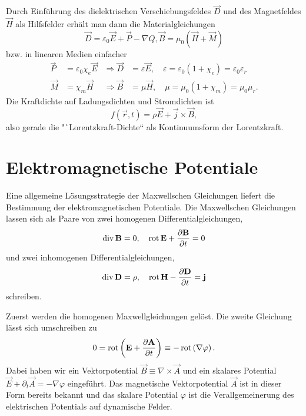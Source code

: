 Durch Einführung des dielektrischen Verschiebungsfeldes $\vec {D}$ und des Magnetfeldes $\vec {H}$ als Hilfsfelder erhält man dann die Materialgleichungen
\begin{equation*}
	\vec {D}=\varepsilon _{0}\vec {E}+\vec {P}-\nabla Q, \vec {B}=\mu _{0}\left(\vec {H}+\vec {M}\right)
\end{equation*}
bzw. in linearen Medien einfacher
\begin{align*}
	\vec {P} & =\varepsilon _{0}\chi _{e}\vec {E} & \Rightarrow \vec {D} & =\varepsilon \vec {E},\quad \varepsilon =\varepsilon _{0}\left(1+\chi _{e}\right)=\varepsilon _{0}\varepsilon _{r} \\
	\vec {M} & =\chi _{m}\vec {H}                 & \Rightarrow \vec {B} & =\mu \vec {H},\quad \mu =\mu _{0}\left(1+\chi _{m}\right)=\mu _{0}\mu _{r}.
\end{align*}
Die Kraftdichte auf Ladungsdichten und Stromdichten ist
\begin{equation*}
	f\left(\vec {r},t\right)=\rho \vec {E}+\vec {j}\times \vec {B},
\end{equation*}
also gerade die "`Lorentzkraft-Dichte`` als Kontinuumsform der Lorentzkraft.

\section{Elektromagnetische Potentiale}

Eine allgemeine Lösungsstrategie der Maxwellschen Gleichungen liefert die Bestimmung der elektromagnetischen Potentiale. Die Maxwellschen Gleichungen lassen sich als Paare von zwei homogenen Differentialgleichungen,
\begin{equation*}
	\operatorname{div} \mathbf{B}=0, \quad\operatorname{rot} \mathbf{E}+\frac{\partial \mathbf{B}}{\partial t}=0
\end{equation*}
und zwei inhomogenen Differentialgleichungen,
\begin{equation*}
	\operatorname{div} \mathbf{D}=\rho ,\quad \operatorname{rot} \mathbf{H}-\frac{\partial \mathbf{D}}{\partial t}=\mathbf{j}
\end{equation*}
schreiben.

Zuerst werden die homogenen Maxwellgleichungen gelöst. Die zweite Gleichung lässt sich umschreiben zu
\begin{equation*}
	0=\operatorname{rot} \left(\mathbf{E}+\frac{\partial \mathbf{A}}{\partial t}\right)\equiv -\operatorname{rot} \left(\nabla \varphi \right).
\end{equation*}
Dabei haben wir ein Vektorpotential $\vec {B}\equiv \nabla \times \vec {A}$ und ein skalares Potential $\vec {E}+\partial _{t}\vec {A}=-\nabla \varphi $ eingeführt. Das magnetische Vektorpotential $\vec {A}$ ist in dieser Form bereits bekannt und das skalare Potential $\varphi $ ist die Verallgemeinerung des elektrischen Potentials auf dynamische Felder.

